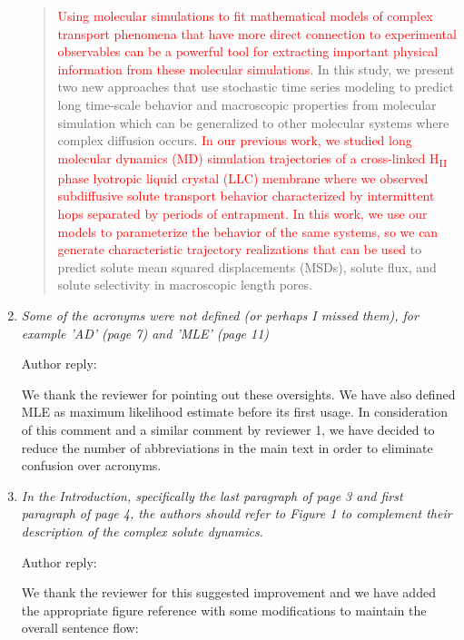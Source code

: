 \documentclass{article}
\begin{document}
\begin{enumerate}[label={Comment \theenumi :}, leftmargin=3.9\parindent]
	\begin{quote}
    \textcolor{red}{Using molecular simulations to fit mathematical models of complex transport phenomena
    that have more direct connection to experimental observables
    can be a powerful tool
    for extracting important physical information from these molecular simulations}. 
    In this study, we present two new approaches that use stochastic time series
    modeling to predict long time-scale behavior and macroscopic properties 
    from molecular simulation which can be generalized to other molecular systems
    where complex diffusion occurs. \textcolor{red}{In our previous work, we studied long 
    molecular dynamics (MD) simulation trajectories of a cross-linked 
    H\textsubscript{II} phase lyotropic liquid crystal (LLC) membrane where we
    observed subdiffusive solute transport behavior characterized by intermittent
    hops separated by periods of entrapment. In this work, we use our models to 
    parameterize the behavior of the same systems, so we can generate characteristic
    trajectory realizations that can be used} to predict solute mean squared 
    displacements (MSDs), solute flux, and solute selectivity in macroscopic length pores.
    \end{quote}
  
    \item \textit{Some of the acronyms were not defined (or perhaps I missed them), for example 'AD' 
    (page 7) and 'MLE' (page 11)}
    
    Author reply:
    
    We thank the reviewer for pointing out these oversights. We have also defined MLE as maximum
    likelihood estimate before its first usage. In consideration of this comment and a similar
    comment by reviewer 1, we have decided to reduce the number of abbreviations in the main text 
    in order to eliminate confusion over acronyms. 

    \item \textit{In the Introduction, specifically the last paragraph of page 3 and first paragraph
    of page 4, the authors should refer to Figure 1 to complement their description of the complex solute
    dynamics.}
    
    Author reply:
    
    We thank the reviewer for this suggested improvement and we have added the appropriate
    figure reference with some modifications to maintain the overall sentence flow:
    

\end{enumerate}
\end{document}
